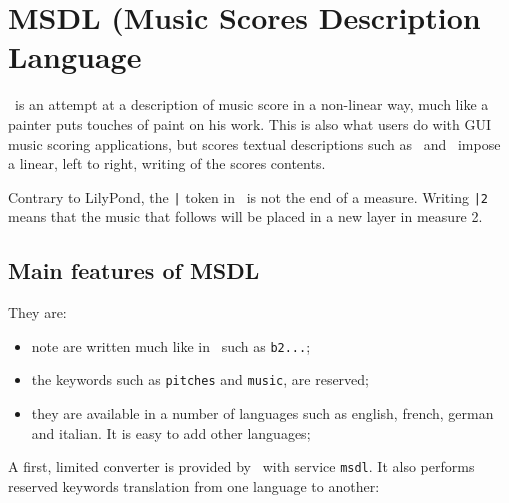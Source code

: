 



\chapter{MSDL (Music Scores Description Language}


\msdlLang\ is an attempt at a description of music score in a non-linear way, much like a painter puts touches of paint on his work. This is also what users do with GUI music scoring applications, but scores textual descriptions such as \lily\ and \guido\ impose a linear, left to right, writing of the scores contents.

Contrary to LilyPond, the {\tt |} token in \msdlLang\ is not the end of a measure. Writing {\tt |2} means that the music that follows will be placed in a new layer in measure 2.


\section{Main features of MSDL}

They are:
\begin{itemize}
\item note are written much like in \lily\, such as {\tt b2...};
\item the keywords such as {\tt pitches} and {\tt music}, are reserved;
\item they are available in a number of languages such as english, french, german and italian. It is easy to add other languages;
\end{itemize}

A first, limited converter is provided by \mf\, with service {\tt msdl}. It also performs reserved keywords translation from one language to another:


